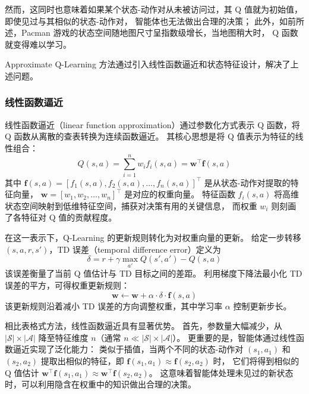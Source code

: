 然而，这同时也意味着如果某个状态-动作对从未被访问过，其 Q 值就为初始值，即使见过与其相似的状态-动作对，
智能体也无法做出合理的决策；
此外，如前所述，Pacman 游戏的状态空间随地图尺寸呈指数级增长，当地图稍大时，
Q 函数就变得难以学习。

Approximate Q-Learning 方法通过引入线性函数逼近和状态特征设计，解决了上述问题。

\subsubsection{线性函数逼近}

线性函数逼近（linear function approximation）通过参数化方式表示 Q 函数，将 Q 函数从离散的查表转换为连续函数逼近。
其核心思想是将 Q 值表示为特征的线性组合：
\begin{equation}
    \label{eq:approx_q}
    Q(s,a) = \sum_{i=1}^n w_i f_i(s,a) = \mathbf{w}^\top \mathbf{f}(s,a)
\end{equation}
其中 $\mathbf{f}(s,a) = [f_1(s,a), f_2(s,a), \ldots, f_n(s,a)]^\top$ 是从状态-动作对提取的特征向量，
$\mathbf{w} = [w_1, w_2, \ldots, w_n]^\top$ 是对应的权重向量。
特征函数 $f_i(s,a)$ 将高维状态空间映射到低维特征空间，捕获对决策有用的关键信息，
而权重 $w_i$ 则刻画了各特征对 Q 值的贡献程度。

在这一表示下，Q-Learning 的更新规则转化为对权重向量的更新。
给定一步转移 $(s, a, r, s')$，TD 误差（temporal difference error）定义为
\begin{equation}
    \label{eq:td_error}
    \delta = r + \gamma \max_{a'} Q(s', a') - Q(s,a)
\end{equation}
该误差衡量了当前 Q 值估计与 TD 目标之间的差距。
利用梯度下降法最小化 TD 误差的平方，可得权重更新规则：
\begin{equation}
    \label{eq:weight_update}
    \mathbf{w} \leftarrow \mathbf{w} + \alpha \cdot \delta \cdot \mathbf{f}(s,a)
\end{equation}
该更新规则沿着减小 TD 误差的方向调整权重，其中学习率 $\alpha$ 控制更新步长。

相比表格式方法，线性函数逼近具有显著优势。
首先，参数量大幅减少，从 $|\mathcal{S}| \times |\mathcal{A}|$ 降至特征维度 $n$（通常 $n \ll |\mathcal{S}| \times |\mathcal{A}|$）。
更重要的是，智能体通过线性函数逼近实现了泛化能力：
类似于插值，当两个不同的状态-动作对 $(s_1, a_1)$ 和 $(s_2, a_2)$ 提取出相似的特征，即 $\mathbf{f}(s_1, a_1) \approx \mathbf{f}(s_2, a_2)$ 时，
它们将得到相似的 Q 值估计 $\mathbf{w}^\top \mathbf{f}(s_1, a_1) \approx \mathbf{w}^\top \mathbf{f}(s_2, a_2)$。
这意味着智能体处理未见过的新状态时，可以利用隐含在权重中的知识做出合理的决策。

